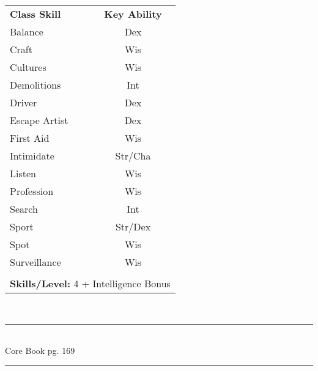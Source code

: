 \begin{table}[htb]
\raggedright
\begin{tabular}{l c}
\textbf{Class Skill} & \textbf{Key Ability}\\

Balance & Dex\\
Craft & Wis\\
Cultures & Wis\\
Demolitions & Int\\
Driver & Dex\\
Escape Artist & Dex\\
First Aid & Wis\\
Intimidate & Str/Cha\\
Listen & Wis\\
Profession & Wis\\
Search & Int\\
Sport & Str/Dex\\
Spot & Wis\\
Surveillance & Wis\\

\multicolumn{2}{l}{\cellcolor{white}}\\
\multicolumn{2}{l}{\cellcolor{white}\textbf{Skills/Level:} 4 + Intelligence Bonus}\\
\end{tabular}
\end{table}

\setlength{\intextsep}{14.0pt plus 4.0pt minus 4.0pt}

\vspace*{10cm}

\vspace*{\fill}

\begin{center}
\textsc{\Large}\\[0.25cm]
\rule{\linewidth}{0.5mm}\\[0.6cm]
\fontsize{30}{30} \selectfont Core Book pg. 169\\
\rule{\linewidth}{0.5mm}\\[0.6cm]
\vfill
\end{center}

\pagebreak



